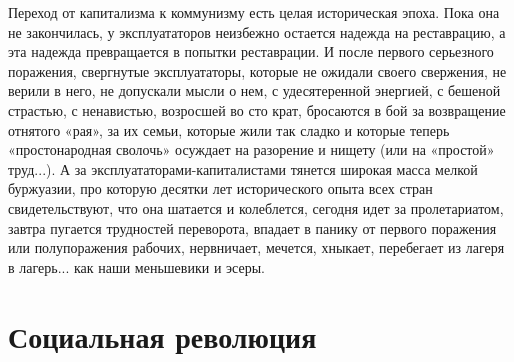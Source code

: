 \documentclass[12pt]{article}
\newcommand\resetparcount{%
  \setcounter{parcount}{0}
}
\newcommand{\parnum}{(\arabic{parcount})}
\newcounter{parcount}
\newenvironment{parnumbers}{%
  \par%
  \everypar{\noindent \stepcounter{parcount}\marginpar[]{\parnum}}%
}{}
\begin{document}
\begin{parnumbers}
Переход от капитализма к коммунизму есть целая историческая эпоха. Пока она не закончилась, у эксплуататоров неизбежно остается надежда на реставрацию, а эта надежда превращается в попытки реставрации. И после первого серьезного поражения, свергнутые эксплуататоры, которые не ожидали своего свержения, не верили в него, не допускали мысли о нем, с удесятеренной энергией, с бешеной страстью, с ненавистью, возросшей во сто крат, бросаются в бой за возвращение отнятого «рая», за их семьи, которые жили так сладко и которые теперь «простонародная сволочь» осуждает на разорение и нищету (или на «простой» труд...). А за эксплуататорами-капиталистами тянется широкая масса мелкой буржуазии, про которую десятки лет исторического опыта всех стран свидетельствуют, что она шатается и колеблется, сегодня идет за пролетариатом, завтра пугается трудностей переворота, впадает в панику от первого поражения или полупоражения рабочих, нервничает, мечется, хныкает, перебегает из лагеря в лагерь... как наши меньшевики и эсеры.
\end{parnumbers}


\section{Социальная революция}
\resetparcount
\end{document}
